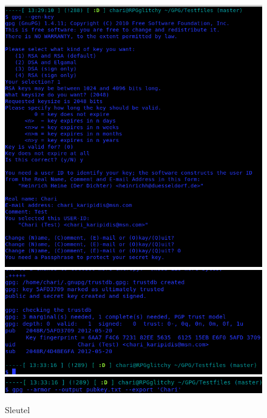 \documentclass[12pt]{article}
\begin{document}
				\begin{figure}
					\begin{center}
						\includegraphics[scale=0.4]{Pictures/Sleutel1}
						\includegraphics[scale=0.4]{Pictures/Sleutel2}
						\includegraphics[scale=0.4]{Pictures/Sleutel3}
					\end{center}
					\caption{Sleutel}\label{Terminal}
				\end{figure}
				
\end{document}

